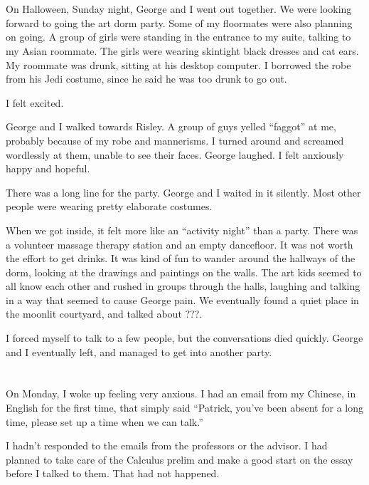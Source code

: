 \section{}

On Halloween, Sunday night, George and I went out together.  We were looking
forward to going the art dorm party.  Some of my floormates were also planning
on going.  A group of girls were standing in the entrance to my suite, talking
to my Asian roommate.  The girls were wearing skintight black dresses and cat
ears.  My roommate was drunk, sitting at his desktop computer.  I borrowed the
robe from his Jedi costume, since he said he was too drunk to go out. 

I felt excited.

George and I walked towards Risley.  A group of guys yelled ``faggot'' at me,
probably because of my robe and mannerisms.  I turned around and screamed
wordlessly at them, unable to see their faces.  George laughed.  I felt
anxiously happy and hopeful.

There was a long line for the party.  George and I waited in it silently.  Most
other people were wearing pretty elaborate costumes.

When we got inside, it felt more like an ``activity night'' than a party.  There
was a volunteer massage therapy station and an empty dancefloor.  It was not
worth the effort to get drinks.  It was kind of fun to wander around the
hallways of the dorm, looking at the drawings and paintings on the walls.  The
art kids seemed to all know each other and rushed in groups through the halls,
laughing and talking in a way that seemed to cause George pain.  We eventually
found a quiet place in the moonlit courtyard, and talked about ???. 

I forced myself to talk to a few people, but the conversations died quickly.
George and I eventually left, and managed to get into another party.

\section{}
On Monday, I woke up feeling very anxious.  I had an email from my
Chinese, in English for the first time, that simply said ``Patrick, you've been
absent for a long time, please set up a time when we can talk.''

I hadn't responded to the emails from the professors or the advisor.  I had
planned to take care of the Calculus prelim and make a good start on the essay
before I talked to them.  That had not happened.

